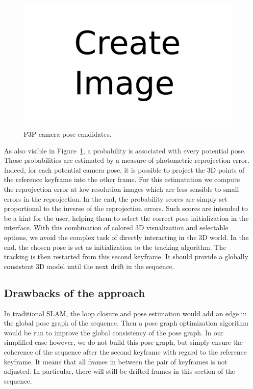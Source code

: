 \begin{figure}[h]
	\centering
	\includegraphics[width=\linewidth]{assets/img/todo.png}
	\caption{P3P camera pose candidates.}%
	\label{fig:p3p}
\end{figure}

As also visible in Figure~\ref{fig:p3p}, a probability is associated with every potential pose.
Those probabilities are estimated by a measure of photometric reprojection error.
Indeed, for each potential camera pose, it is possible to project the 3D points
of the reference keyframe into the other frame.
For this estimatation we compute the reprojection error at low resolution images
which are less sensible to small errors in the reprojection.
In the end, the probability scores are simply set proportional to the inverse of the reprojection errors.
Such scores are intended to be a hint for the user,
helping them to select the correct pose initialization in the interface.
With this combination of colored 3D visualization and selectable options,
we avoid the complex task of directly interacting in the 3D world.
In the end, the chosen pose is set as initialization to the tracking algorithm.
The tracking is then restarted from this second keyframe.
It should provide a globally consistent 3D model until the next drift in the sequence.

\subsection{Drawbacks of the approach}%
\label{sub:drawbacks}

In traditional SLAM, the loop closure and pose estimation would add
an edge in the global pose graph of the sequence.
Then a pose graph optimization algorithm would be run to improve the global
consistency of the pose graph.
In our simplified case however, we do not build this pose graph,
but simply ensure the coherence of the sequence after the second keyframe
with regard to the reference keyframe.
It means that all frames in between the pair of keyframes is not adjusted.
In particular, there will still be drifted frames in this section of the sequence.

